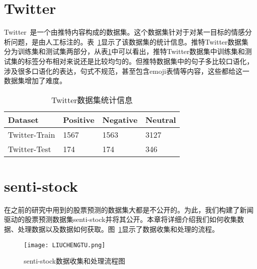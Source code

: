 \section{Twitter}
Twitter~\cite{dong2014adaptive}是一个由推特内容构成的数据集。这个数据集针对于对某一目标的情感分析问题，是由人工标注的。表~\ref{tab:twitterdataset}显示了该数据集的统计信息。推特Twitter数据集分为训练集和测试集两部分，从表\ref{tab:twitterdataset}中可以看出，推特Twitter数据集中训练集和测试集的标签分布相对来说还是比较均匀的。但推特数据集中的句子多比较口语化，涉及很多口语化的表达，句式不规范，甚至包含emoji表情等内容，这些都给这一数据集增加了难度。
\begin{table}[ht]
	\centering 
	\caption{Twitter数据集统计信息}
	\label{tab:twitterdataset}
	\begin{tabular}{|l|l|l|l|}
	\hline
	Dataset & Positive & Negative & Neutral\\
	\hline 
	Twitter-Train & 1567 & 1563 & 3127 \\
	Twitter-Test & 174 & 174 & 346 \\
	\hline
	\end{tabular}
\end{table}
\section{senti-stock}

在之前的研究中用到的股票预测的数据集大都是不公开的。为此，我们构建了新闻驱动的股票预测数据集senti-stock并将其公开。本章将详细介绍我们如何收集数据、处理数据以及数据如何获取。图~\ref{fig:liuchengtu}显示了数据收集和处理的流程。

\begin{figure}[ht]
	\centering 
	\texttt{[image: LIUCHENGTU.png]}
	\caption{senti-stock数据收集和处理流程图}
	\label{fig:liuchengtu}
\end{figure}

